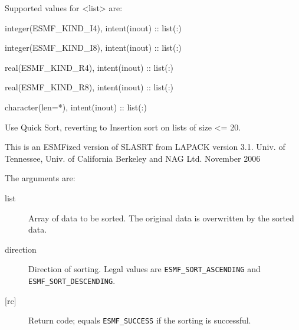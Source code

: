  
   Supported values for <list> are: 
   \begin{description} 
   \item integer(ESMF\_KIND\_I4), intent(inout) :: list(:) 
   \item integer(ESMF\_KIND\_I8), intent(inout) :: list(:) 
   \item real(ESMF\_KIND\_R4), intent(inout) :: list(:) 
   \item real(ESMF\_KIND\_R8), intent(inout) :: list(:) 
   \item character(len=*), intent(inout) :: list(:) 
   \end{description}
   
   Use Quick Sort, reverting to Insertion sort on lists of 
   size <= 20. 
   
   This is an ESMFized version of SLASRT from LAPACK version 3.1. 
   Univ. of Tennessee, Univ. of California Berkeley and NAG Ltd. 
   November 2006 
   
   The arguments are: 
   \begin{description} 
   \item [list] 
   Array of data to be sorted. The original data is overwritten by the 
   sorted data. 
   \item [direction] 
   Direction of sorting. Legal values are {\tt ESMF\_SORT\_ASCENDING} 
   and {\tt ESMF\_SORT\_DESCENDING}. 
   \item [{[rc]}] 
   Return code; equals {\tt ESMF\_SUCCESS} if the sorting is successful. 
   \end{description} 
   
\setlength{\parskip}{\oldparskip}
\setlength{\parindent}{\oldparindent}
\setlength{\baselineskip}{\oldbaselineskip}
